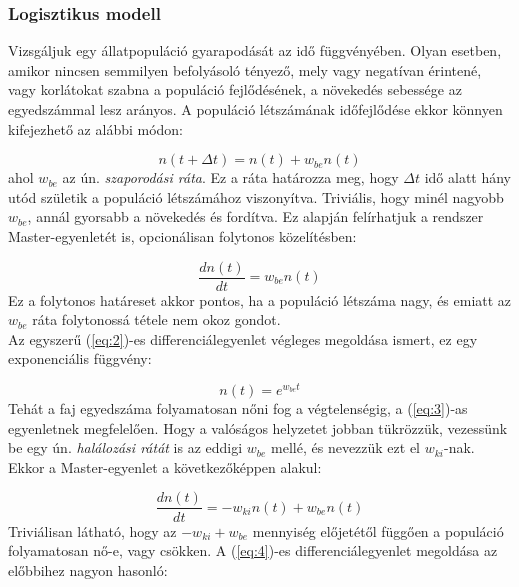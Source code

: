 \begin{multicols}{2}
\subsubsection{Logisztikus modell} \label{subsub:3.1.1}
Vizsgáljuk egy állatpopuláció gyarapodását az idő függvényében. Olyan esetben, amikor nincsen semmilyen befolyásoló tényező, mely vagy negatívan érintené, vagy korlátokat szabna a populáció fejlődésének, a növekedés sebessége az egyedszámmal lesz arányos. A populáció létszámának időfejlődése ekkor könnyen kifejezhető az alábbi módon:

\begin{equation} \label{eq:1}
    n \left( t + \Delta t \right)
    =
    n \left( t \right)
    +
    w_{be} n \left( t \right)
\end{equation}
ahol $w_{be}$ az ún. \emph{szaporodási ráta}. Ez a ráta határozza meg, hogy $\Delta t$ idő alatt hány utód születik a populáció létszámához viszonyítva. Triviális, hogy minél nagyobb $w_{be}$, annál gyorsabb a növekedés és fordítva. Ez alapján felírhatjuk a rendszer Master-egyenletét is, opcionálisan folytonos közelítésben:

\begin{equation} \label{eq:2}
    \frac{dn \left( t \right)}{dt}
    =
    w_{be} n \left( t \right)
\end{equation}
Ez a folytonos határeset akkor pontos, ha a populáció létszáma nagy, és emiatt az $w_{be}$ ráta folytonossá tétele nem okoz gondot. \\
Az egyszerű (\ref{eq:2})-es differenciálegyenlet végleges megoldása ismert, ez egy exponenciális függvény:

\begin{equation} \label{eq:3}
    n \left( t \right)
    =
    e^{w_{be} t}
\end{equation}
Tehát a faj egyedszáma folyamatosan nőni fog a végtelenségig, a (\ref{eq:3})-as egyenletnek megfelelően. Hogy a valóságos helyzetet jobban tükrözzük, vezessünk be egy ún. \emph{halálozási rátát} is az eddigi $w_{be}$ mellé, és nevezzük ezt el $w_{ki}$-nak. Ekkor a Master-egyenlet a következőképpen alakul:

\begin{equation} \label{eq:4}
    \frac{dn \left( t \right)}{dt}
    =
    -w_{ki} n \left( t \right) + w_{be} n \left( t \right)
\end{equation}
Triviálisan látható, hogy az $- w_{ki} + w_{be}$ mennyiség előjetétől függően a populáció folyamatosan nő-e, vagy csökken. A (\ref{eq:4})-es differenciálegyenlet megoldása az előbbihez nagyon hasonló:


\end{multicols}
